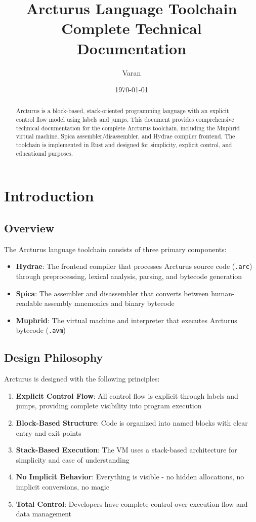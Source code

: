 \documentclass[11pt,a4paper]{article}
\title{\textbf{Arcturus Language Toolchain} \\ \large Complete Technical Documentation}
\author{Varan}
\date{\today}
\begin{document}
\maketitle

\begin{abstract}
Arcturus is a block-based, stack-oriented programming language with an explicit control flow model using labels and jumps. This document provides comprehensive technical documentation for the complete Arcturus toolchain, including the Muphrid virtual machine, Spica assembler/disassembler, and Hydrae compiler frontend. The toolchain is implemented in Rust and designed for simplicity, explicit control, and educational purposes.
\end{abstract}

\tableofcontents
\newpage

\section{Introduction}

\subsection{Overview}
The Arcturus language toolchain consists of three primary components:

\begin{itemize}
    \item \textbf{Hydrae}: The frontend compiler that processes Arcturus source code (\texttt{.arc}) through preprocessing, lexical analysis, parsing, and bytecode generation
    \item \textbf{Spica}: The assembler and disassembler that converts between human-readable assembly mnemonics and binary bytecode
    \item \textbf{Muphrid}: The virtual machine and interpreter that executes Arcturus bytecode (\texttt{.avm})
\end{itemize}

\subsection{Design Philosophy}
Arcturus is designed with the following principles:

\begin{enumerate}
    \item \textbf{Explicit Control Flow}: All control flow is explicit through labels and jumps, providing complete visibility into program execution
    \item \textbf{Block-Based Structure}: Code is organized into named blocks with clear entry and exit points
    \item \textbf{Stack-Based Execution}: The VM uses a stack-based architecture for simplicity and ease of understanding
    \item \textbf{No Implicit Behavior}: Everything is visible - no hidden allocations, no implicit conversions, no magic
    \item \textbf{Total Control}: Developers have complete control over execution flow and data management
\end{enumerate}
\end{document}
